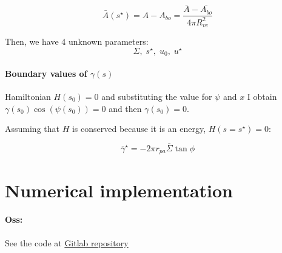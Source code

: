\documentclass[12pt]{article}
\begin{document}
$$
\bar{A}(s^\star) = A - A_{bo} = \frac{\bar{A} - \bar{A_{bo}}}{4 \pi R_{ve}^2}
$$


Then, we have 4 unknown parameters:
$$\Sigma,\; s^\star ,\;u_0, \; u^\star$$




\paragraph*{Boundary values of $\gamma(s)$}
Hamiltonian $H(s_0)=0$ and substituting the value for $\psi$ and $x$ I obtain $\gamma(s_0) \cos(\psi(s_0))=0$ and then $\gamma(s_0)=0$. 

Assuming that $H$ is conserved because it is an energy, $H(s=s^\star)=0$: 

$$
\bar{\gamma}^\star = - 2 \pi r_{pa} \bar{\Sigma} \tan \phi
$$


\section{Numerical implementation}
\paragraph{Oss:} See the code at \href{https://gitlab.tudelft.nl/ig-projects/ParticleWrapping/-/tree/dev?ref_type=heads}{Gitlab repository}
\end{document}
